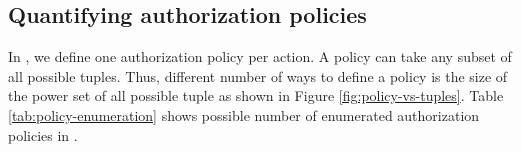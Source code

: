  
\subsection{Quantifying \labacOneOneOne{} authorization policies}
In \eapABAC{}, we define one authorization policy per action.  A policy can take any subset of all possible tuples. Thus, different number of ways to define a policy  is the size of the power set of all possible tuple as shown in Figure \ref{fig:policy-vs-tuples}.  Table \ref{tab:policy-enumeration} shows possible number of enumerated authorization policies in \labac{}.




